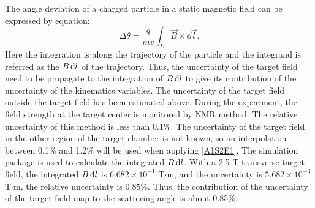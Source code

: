The angle deviation of a charged particle in a static magnetic field can be expressed by equation:
\begin{equation} \label{A1S2E1}
\Delta\theta=\frac{q}{mv}\int_{L}\vec{B}\times\dd{\vec{l}}.
\end{equation}
Here the integration is along the trajectory of the particle and the integrand is referred as the $B\dd{l}$ of the trajectory. Thus, the uncertainty of the target field need to be propagate to the integration of $B\dd{l}$ to give its contribution of the uncertainty of the kinematics variables. The uncertainty of the target field outside the target field has been estimated above. During the experiment, the field strength at the target center is monitored by NMR method. The relative uncertainty of this method is less than 0.1\%. The uncertainty of the target field in the other region of the target chamber is not known, so an interpolation between 0.1\% and 1.2\% will be used when applying \cref{A1S2E1}. The simulation package is used to calculate the integrated $B\dd{l}$. With a 2.5 T transverse target field, the integrated $B\dd{l}$ is $6.682\times 10^{-1}$ T$\cdot$m, and the uncertainty is $5.682\times 10^{-3}$ T$\cdot$m, the relative uncertainty is 0.85\%. Thus, the contribution of the uncertainty of the target field map to the scattering angle is about 0.85\%.

\newpage
\cleardoublepage

